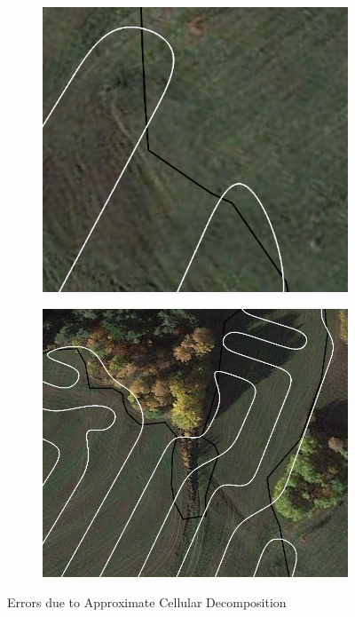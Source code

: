 \begin{figure}[ht]
	\centering
	\begin{subfigure}{.49\textwidth}
	  \centering
	  \includegraphics[width=.9\linewidth]{figures/Field3/Field3-imperfection.png}
	  \caption{}
	  \label{sfig:CPP-imperfection1}
	\end{subfigure}
	\begin{subfigure}{.49\textwidth}
	  \centering
	  \includegraphics[width=.95\linewidth]{figures/Field3/Field3-imperfection2.png}
	  \caption{}
	  \label{sfig:CPP-imperfection2}
	\end{subfigure}
	\caption{Errors due to Approximate Cellular Decomposition}
    \label{fig:CPP-imperfections}
\end{figure}
